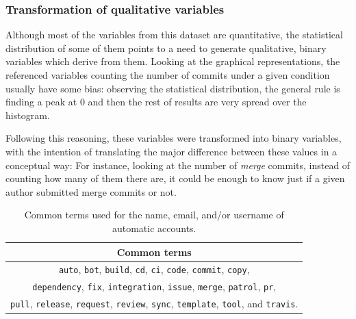 \documentclass[a4paper, 12pt]{book}
\begin{document}
\subsubsection{Transformation of qualitative variables}
\label{sssec:transformation-qualitative}

Although most of the variables from this dataset are quantitative, the statistical distribution of some of them points to a need to generate 
qualitative, binary variables which derive from them. Looking at the graphical representations, the referenced variables counting the number of commits under a given condition usually have some bias: observing the statistical distribution, the general rule is finding  a peak at $0$ and then the rest of results are very spread over the histogram. 

Following this reasoning, these variables were transformed into binary variables, with the intention of translating the major difference between these values in a conceptual way: For instance, looking at the number of \textit{merge} commits, instead of counting how many of them there are, it could be enough to know just if a given author submitted merge commits or not.

\begin{table}[htb]  %
 \renewcommand{\arraystretch}{1.2}  %
 \begin{center}
  \begin{tabular}{ c }
    \toprule    %
    \textbf{Common terms} \\
    \midrule
    \texttt{auto}, \texttt{bot}, \texttt{build}, \texttt{cd}, \texttt{ci}, \texttt{code}, \texttt{commit}, \texttt{copy},\\
    \texttt{dependency}, \texttt{fix}, \texttt{integration}, \texttt{issue}, \texttt{merge}, \texttt{patrol}, \texttt{pr},\\
    \texttt{pull}, \texttt{release}, \texttt{request}, \texttt{review}, \texttt{sync}, \texttt{template}, \texttt{tool}, and \texttt{travis}. \\
    \bottomrule     %
  \end{tabular}
  \caption{Common terms used for the name, email, and/or username of automatic accounts.}
  \label{table:common-bot-terms}
 \end{center}
\end{table}
\end{document}
